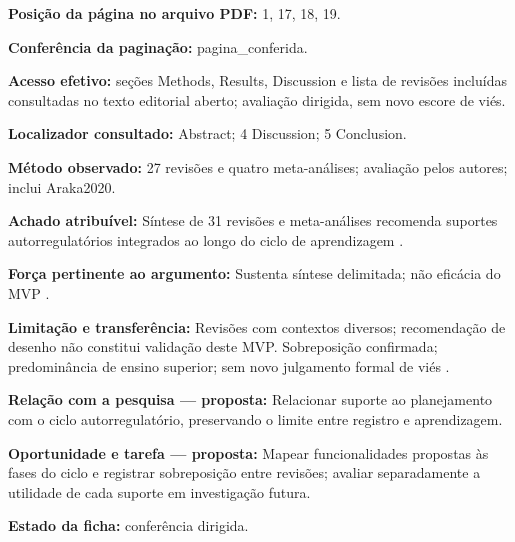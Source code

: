 \noindent\textbf{Posição da página no arquivo PDF:} 1, 17, 18, 19.\par\medskip

\noindent\textbf{Conferência da paginação:} pagina\_conferida.\par\medskip

\noindent\textbf{Acesso efetivo:} seções Methods, Results, Discussion e lista de revisões incluídas consultadas no texto editorial aberto; avaliação dirigida, sem novo escore de viés.\par\medskip

\noindent\textbf{Localizador consultado:} Abstract; 4 Discussion; 5 Conclusion.\par\medskip

\noindent\textbf{Método observado:} 27 revisões e quatro meta-análises; avaliação pelos autores; inclui Araka2020.\par\medskip

\noindent\textbf{Achado atribuível:} Síntese de 31 revisões e meta-análises recomenda suportes autorregulatórios integrados ao longo do ciclo de aprendizagem \citep[p. 1809, 1825–1827]{education_prasse2024}.\par\medskip

\noindent\textbf{Força pertinente ao argumento:} Sustenta síntese delimitada; não eficácia do MVP \citep[p. 1809, 1825–1827]{education_prasse2024}.\par\medskip

\noindent\textbf{Limitação e transferência:} Revisões com contextos diversos; recomendação de desenho não constitui validação deste MVP. Sobreposição confirmada; predominância de ensino superior; sem novo julgamento formal de viés \citep[p. 1809, 1825–1827]{education_prasse2024}.\par\medskip

\noindent\textbf{Relação com a pesquisa — proposta:} Relacionar suporte ao planejamento com o ciclo autorregulatório, preservando o limite entre registro e aprendizagem.\par\medskip

\noindent\textbf{Oportunidade e tarefa — proposta:} Mapear funcionalidades propostas às fases do ciclo e registrar sobreposição entre revisões; avaliar separadamente a utilidade de cada suporte em investigação futura.\par\medskip

\noindent\textbf{Estado da ficha:} conferência dirigida.\par\medskip

